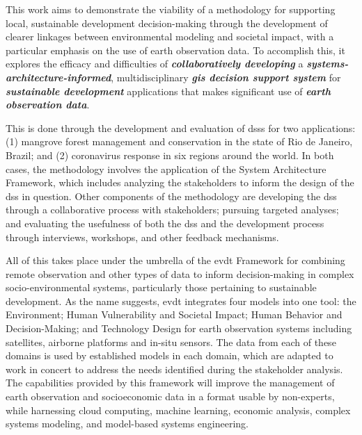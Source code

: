 % 
% 
%
This work aims to demonstrate the viability of a methodology for supporting local, sustainable development decision-making through the development of clearer linkages between environmental modeling and societal impact, with a particular emphasis on the use of earth observation data. To accomplish this, it explores the efficacy and difficulties of \textbf{\textit{collaboratively developing}} a \textbf{\textit{systems-architecture-informed}}, multidisciplinary \textbf{\textit{\acs{gis} decision support system}} for \textbf{\textit{sustainable development}} applications that makes significant use of \textbf{\textit{earth observation data}}. 

This is done through the development and evaluation of \acp{dss} for two applications: (1) mangrove forest management and conservation in the state of Rio de Janeiro, Brazil; and (2) coronavirus response in six regions around the world. In both cases, the methodology involves the application of the System Architecture Framework, which includes analyzing the stakeholders to inform the design of the \ac{dss} in question. Other components of the methodology are developing the \ac{dss} through a collaborative process with stakeholders; pursuing targeted analyses; and evaluating the usefulness of both the \ac{dss} and the development process through interviews, workshops, and other feedback mechanisms.

All of this takes place under the umbrella of the \ac{evdt} Framework for combining remote observation and other types of data to inform decision-making in complex socio-environmental systems, particularly those pertaining to sustainable development. As the name suggests, \ac{evdt} integrates four models into one tool: the Environment; Human Vulnerability and Societal Impact; Human Behavior and Decision-Making; and Technology Design for earth observation systems including satellites, airborne platforms and in-situ sensors. The data from each of these domains is used by established models in each domain, which are adapted to work in concert to address the needs identified during the stakeholder analysis. The capabilities provided by this framework will improve the management of earth observation and socioeconomic data in a format usable by non-experts, while harnessing cloud computing, machine learning, economic analysis, complex systems modeling, and model-based systems engineering.

